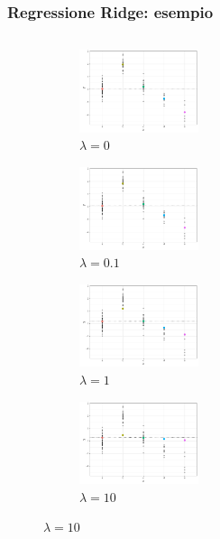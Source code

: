 \documentclass[pdf, aspectratio=169, xcolor=dvipsnames]{beamer}\usepackage[]{graphicx}\usepackage[]{color}
\theoremstyle{definition}
\begin{document}
\begin{frame}
\frametitle{Regressione Ridge: esempio}

\fontsize{9pt}{11pt}\selectfont

\begin{columns}[c]
\begin{column}{0.55\linewidth}
  \begin{figure}
    \centering
    \begin{subfigure}[b]{3cm}
      \centering
      \caption{$\lambda = 0$}
      \includegraphics[width=3.5cm]{_bookdown_files/_main_files/figure-latex/ridge-lambda-1.pdf}
    \end{subfigure}
    \qquad
    \begin{subfigure}[b]{3cm}
      \centering
      \caption{$\lambda = 0.1$}
      \includegraphics[width=3.5cm]{_bookdown_files/_main_files/figure-latex/ridge-lambda-2.pdf}
    \end{subfigure}
    \par\medskip
    \begin{subfigure}[b]{3cm}
      \centering
      \caption{$\lambda = 1$}
      \includegraphics[width=3.5cm]{_bookdown_files/_main_files/figure-latex/ridge-lambda-3.pdf}
    \end{subfigure}
    \qquad
    \begin{subfigure}[b]{3cm}
      \centering
      \caption{$\lambda = 10$}
      \includegraphics[width=3.5cm]{_bookdown_files/_main_files/figure-latex/ridge-lambda-4.pdf}

\end{subfigure}
\end{figure}
\end{column}
\end{columns}
\end{frame}
\end{document}
